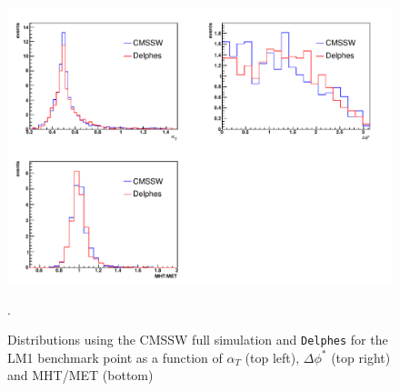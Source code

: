 \begin{figure}[htbp]
\begin{center}
\includegraphics[height=9.cm]{figs/alphat.pdf} 
\caption{Distributions using the CMSSW full simulation and {\tt Delphes} for the LM1 benchmark point
as a function of $\alpha_{T}$ (top left), $\Delta \phi^{*}$ (top right) and MHT/MET (bottom)}.
\label{fig:alphat}
\end{center}
\end{figure}

